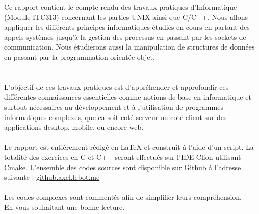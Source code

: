 \documentclass[12pt,a4paper]{book} %
\begin{document}
Ce rapport contient le compte-rendu des travaux pratiques d’Informatique (Module ITC313) concernant les parties UNIX ainsi que C/C++.
Nous allons appliquer les différents principes informatiques étudiés en cours en partant des appels systèmes jusqu'à la gestion des processus en passant par les sockets de communication.
Nous étudierons aussi la manipulation de structures de données en passant par la programmation orientée objet.\\
\\\\
L’objectif de ces travaux pratiques est d’appréhender et approfondir ces différentes connaissances essentielles comme notions de base en informatique et surtout nécessaires au développement et à l'utilisation de programmes informatiques complexes, que ca soit coté serveur ou coté client sur des applications desktop, mobile, ou encore web.
\\\\
Le rapport est entièrement rédigé en LaTeX et construit à l'aide d'un script. La totalité des exercices en C et C++ seront effectués sur l'IDE Clion utilisant Cmake. L'ensemble des codes sources sont disponible sur Github à l'adresse suivante : \href{http://github.axel.lebot.me}{github.axel.lebot.me}
\\\\
Les codes complexes sont commentés afin de simplifier leurs compréhension.\\ 
En vous souhaitant une bonne lecture.

\cleardoublepage %

\pagestyle{fancy} %




\pagestyle{empty} %

\tableofcontents %

\cleardoublepage %
\end{document}
